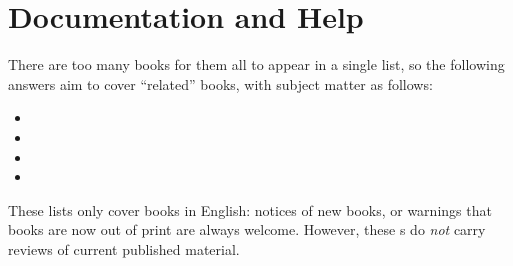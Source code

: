 
\section{Documentation and Help}


There are too many books for them all to appear in a single list, so
the following answers aim to cover ``related'' books, with subject
matter as follows:
\begin{itemize}
\item {}
\item {}
\item {}
\item {}
\end{itemize}

These lists only cover books in English: notices of new books, or
warnings that books are now out of print are always welcome.  However,
these s do \emph{not} carry reviews of current published
material.


